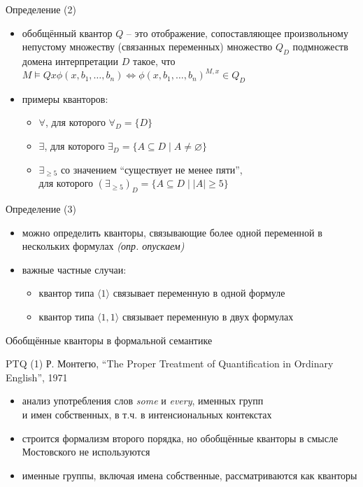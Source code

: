 \documentclass{beamer}
\begin{document}
\begin{frame}{Определение (2)}
\begin{itemize}
	\item обобщённый квантор $Q$ -- это отображение, сопоставляющее произвольному непустому множеству (связанных переменных) множество $Q_D$ подмножеств домена интерпретации $D$ такое, что $M \models Q x \phi(x, b_1, \dots, b_n) \Leftrightarrow \phi(x, b_1, \dots, b_n)^{M,x} \in Q_D$
    \bigskip
    \item примеры кванторов:
    \medskip
    \begin{itemize}
        \item $\forall$, для которого $\forall_D = \{ D \}$
        \medskip
        \item $\exists$, для которого $\exists_D = \{ A \subseteq D \; | \; A \neq \varnothing \}$
        \medskip
        \item $\exists_{\geq 5}$ со значением ``существует не менее пяти'',\\ для которого $(\exists_{\geq 5})_D = \{ A \subseteq D \; | \; |A| \geq 5 \}$
    \end{itemize}	
\end{itemize}
\end{frame}

\begin{frame}{Определение (3)}
\begin{itemize}
	\item можно определить кванторы, связывающие более одной переменной в нескольких формулах \textit{(опр. опускаем)}
	\medskip
	\item важные частные случаи:
	\medskip
	\begin{itemize}
        \item квантор типа $\langle 1 \rangle$ связывает переменную в одной формуле
        \medskip
        \item квантор типа $\langle 1, 1 \rangle$ связывает переменную в двух формулах
    \end{itemize}
\end{itemize}
\end{frame}

\begin{frame}{}
\begin{center}
Обобщённые кванторы в формальной семантике
\end{center}
\end{frame}

\begin{frame}{PTQ (1)}
Р. Монтегю, ``The Proper Treatment of Quantification in Ordinary English'', 1971
\bigskip
\begin{itemize}
    \item анализ употребления слов \textit{some} и \textit{every}, именных групп \\и имен собственных, в т.ч. в интенсиональных контекстах
	\item строится формализм второго порядка, но обобщённые кванторы в смысле Мостовского не используются
	\item именные группы, включая имена собственные, рассматриваются как кванторы
\end{itemize}
\end{frame}
\end{document}
